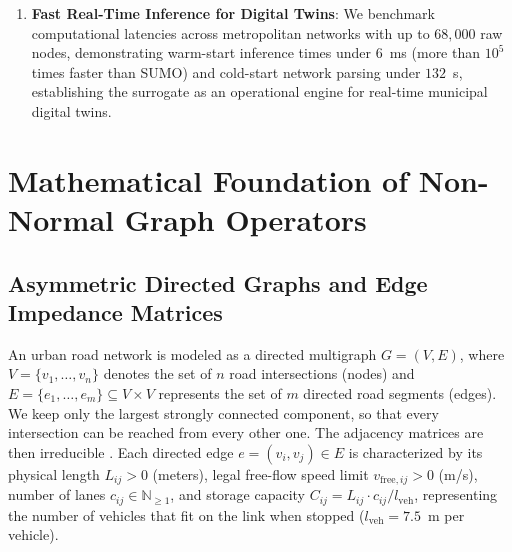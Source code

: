 \documentclass[journal]{IEEEtran}
\begin{document}
\begin{enumerate}
    \item \textbf{Fast Real-Time Inference for Digital Twins}: We benchmark computational latencies across metropolitan networks with up to $68,000$ raw nodes, demonstrating warm-start inference times under $6$~ms (more than $10^5$ times faster than SUMO) and cold-start network parsing under $132$~s, establishing the surrogate as an operational engine for real-time municipal digital twins.
\end{enumerate}

\section{Mathematical Foundation of Non-Normal Graph Operators}

\subsection{Asymmetric Directed Graphs and Edge Impedance Matrices}
An urban road network is modeled as a directed multigraph $G = (V, E)$, where $V = \{v_1, \dots, v_n\}$ denotes the set of $n$ road intersections (nodes) and $E = \{e_1, \dots, e_m\} \subseteq V \times V$ represents the set of $m$ directed road segments (edges). We keep only the largest strongly connected component, so that every intersection can be reached from every other one. The adjacency matrices are then irreducible \cite{Horn2013, Berman1994}. Each directed edge $e = (v_i, v_j) \in E$ is characterized by its physical length $L_{ij} > 0$ (meters), legal free-flow speed limit $v_{\text{free}, ij} > 0$ (m/s), number of lanes $c_{ij} \in \mathbb{N}_{\ge 1}$, and storage capacity $C_{ij} = L_{ij} \cdot c_{ij} / l_{\text{veh}}$, representing the number of vehicles that fit on the link when stopped ($l_{\text{veh}} = 7.5$~m per vehicle).
\end{document}
